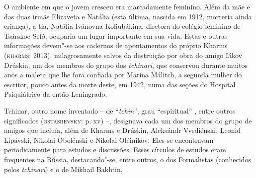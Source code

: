 O ambiente em que o jovem cresceu era marcadamente feminino. Além da mãe
e das duas irmãs Elizaveta e Natália (esta última, nascida em 1912,
morreria ainda criança), a tia, Natália Ivánovna Koliubákina, diretora
do colégio feminino de Tsárskoe Seló, ocuparia um lugar importante em
sua vida. Estas e outras informações devem"-se aos cadernos de
apontamentos do próprio Kharms (\textsc{kharms}: 2013), milagrosamente
salvos da destruição por obra do amigo Iákov Drúskin, um dos membros do
grupo dos \emph{tchinari}, que conservou durante muitos anos a maleta
que lhe fora confiada por Marina Málitch, a segunda mulher do escritor,
pouco antes da morte deste, em 1942, numa das seções do Hospital
Psiquiátrico da então Leningrado.

Tchinar, outro nome inventado -- de ``\emph{tchin}'', grau
``espiritual'' , entre outros significados (\textsc{ostashevsky}: p. xv)
--, designava cada um dos membros do grupo de amigos que incluía, além
de Kharms e Drúskin, Aleksándr Vvediénski, Leonid Lipávski, Nikolai
Obolénski e Nikolai Oléinikov. Eles se encontravam periodicamente para
estudos e discussões. Esses círculos de estudos eram frequentes na
Rússia, destacando"-se, entre outros, o dos Formalistas (conhecidos pelos
\emph{tchinari}) e o de Mikhail Bakhtin.


